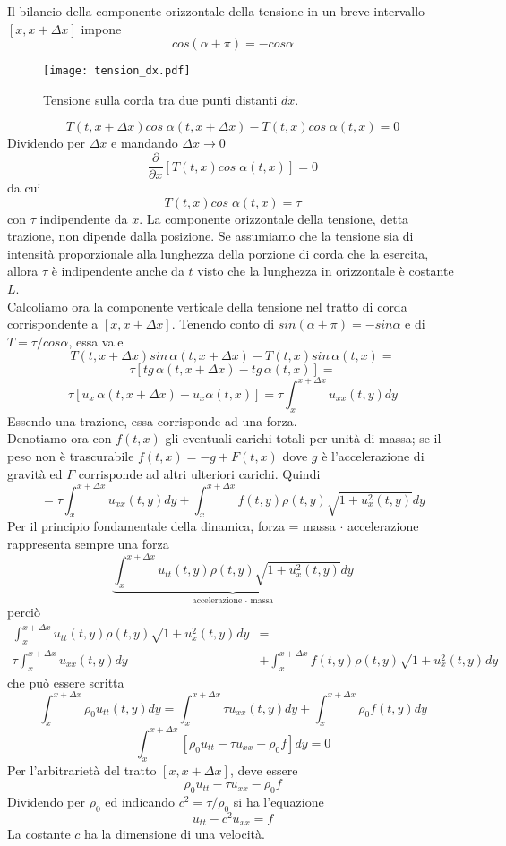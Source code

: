 Il bilancio della componente orizzontale della tensione in un breve intervallo
$[x,x+\Delta x]$ impone
\[
	cos(\alpha + \pi)= - cos \alpha
\]
\begin{figure}[H]
	\centering
	\texttt{[image: tension\_dx.pdf]}
	\caption{Tensione sulla corda tra due punti distanti $dx$.}
	\label{tension_dx}
\end{figure}
\[
	T(t, x + \Delta x) cos \; \alpha(t, x + \Delta x)-
	T(t,x)cos \; \alpha(t,x)=0
\]
Dividendo per $\Delta x$ e mandando $\Delta x \to 0$
\[
	\frac{\partial}{\partial x}[T(t,x) cos \; \alpha(t,x)]=0
\]
da cui
\[
	T(t,x) cos \; \alpha(t,x)= \tau
\]
con $\tau$ indipendente da $x$.
La componente orizzontale della tensione, detta trazione, non dipende dalla
posizione. Se assumiamo che la tensione sia di intensit\`a proporzionale
alla lunghezza della porzione di corda che la esercita, allora $\tau$ \`e
indipendente anche da $t$ visto che la lunghezza in orizzontale \`e costante
$L$.\\
Calcoliamo ora la componente verticale della tensione nel tratto di corda
corrispondente a $[x, x+ \Delta x]$. Tenendo conto di $sin(\alpha + \pi)= - sin
\alpha$ e di $T= \tau/cos\alpha$, essa vale
\[
	T(t,x+\Delta x)sin \, \alpha(t, x+ \Delta x) - T(t,x)sin \, \alpha
(t,x)=
\]
\[
	\tau[tg \, \alpha (t, x + \Delta x)- tg  \, \alpha(t,x)]=
\]
\[
	\tau[u_x \, \alpha (t, x + \Delta x)- u_x \alpha(t,x)]=
	\tau \int_x^{x+\Delta x} u_{xx}(t,y) dy
\]
Essendo una trazione, essa corrisponde ad una forza.\\
Denotiamo ora con $f(t,x)$ gli eventuali carichi totali per unit\`a di massa; se
il
peso non \`e trascurabile $f(t,x)= -g + F(t,x)$ dove $g$ \`e l'accelerazione
di gravit\`a ed $F$ corrisponde ad altri ulteriori carichi. Quindi
\[
	=\tau \int_x^{x+\Delta x} u_{xx}(t,y) dy +
	\int_x^{x+\Delta x} f(t,y) \rho (t,y) \sqrt{1+ u_x^2(t,y)} dy
\]
Per il principio fondamentale della dinamica, forza = massa $\cdot$
accelerazione rappresenta sempre una forza
\[
	\underbrace{\int_x^{x+\Delta x} u_{tt}(t,y) \rho (t,y) \sqrt{1+
u_x^2(t,y)} dy}_{
	\text{accelerazione $\cdot$ massa}}
\]
perci\`o
\begin{align*}
	\int_x^{x+\Delta x} u_{tt}(t,y) \rho (t,y) \sqrt{1+ u_x^2(t,y)} dy&= \\
	\tau \int_x^{x+\Delta x} u_{xx}(t,y) dy &+
	\int_x^{x+\Delta x} f(t,y) \rho (t,y) \sqrt{1+ u_x^2(t,y)} dy
\end{align*}
che pu\`o essere scritta
\[
	\int_x^{x+\Delta x}\rho_0 u_{tt}(t,y)  dy=
	\int_x^{x+\Delta x} \tau u_{xx}(t,y) dy +
	\int_x^{x+\Delta x} \rho_0 f(t,y)  dy
\]
\[
	\int_x^{x+\Delta x} \left[
	\rho_0 u_{tt} - \tau u_{xx}-  \rho_0 f
	\right]dy= 0
\]
Per l'arbitrariet\`a del tratto $[x, x+ \Delta x]$, deve essere
\[
	\rho_0 u_{tt} - \tau u_{xx}-  \rho_0 f
\]
Dividendo per $\rho_0$ ed indicando $c^2=\tau / \rho_0$ si ha l'equazione
\[
	u_{tt} - c^2 u_{xx} = f
\]
La costante $c$ ha la dimensione di una velocit\`a.

